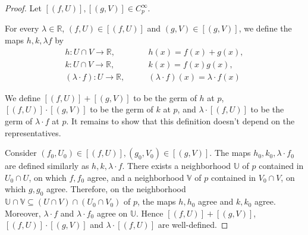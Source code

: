 \begin{proof}
	Let \( [(f, U)], [(g, V)] \in C^{\infty}_{p} \).

	For every \( \lambda \in \mathbb{R} \), \( (f, U) \in [(f, U)] \) and \( (g, V) \in [(g, V)] \), we define the maps \( h, k, \lambda f \) by
	\begin{align*}
		h: U \cap V \to \mathbb{R},         & \qquad h(x) = f(x) + g(x),                      \\
		k: U \cap V \to \mathbb{R},         & \qquad k(x) = f(x)g(x),                         \\
		(\lambda\cdot f): U \to \mathbb{R}, & \qquad (\lambda\cdot f)(x) = \lambda \cdot f(x)
	\end{align*}

	We define \( [(f, U)] + [(g, V)] \) to be the germ of \( h \) at \( p \), \(  [(f, U)]\cdot [(g, V)] \) to be the germ of \( k \) at \( p \), and \( \lambda\cdot [(f, U)] \) to be the germ of \( \lambda\cdot f \) at \( p \). It remains to show that this definition doesn't depend on the representatives.

	Consider \( (f_{0}, U_{0}) \in [(f, U)], (g_{0}, V_{0}) \in [(g, V)] \). The maps \( h_{0}, k_{0}, \lambda\cdot f_{0} \) are defined similarly as \( h, k, \lambda\cdot f \). There exists a neighborhood \( \mathbb{U} \) of \( p \) contained in \( U_{0} \cap U \), on which \( f, f_{0} \) agree, and a neighborhood \( \mathbb{V} \) of \( p \) contained in \( V_{0} \cap V \), on which \( g, g_{0} \) agree. Therefore, on the neighborhood \( \mathbb{U} \cap \mathbb{V} \subseteq (U \cap V) \cap (U_{0} \cap V_{0}) \) of \( p \), the maps \( h, h_{0} \) agree and \( k, k_{0} \) agree. Moreover, \( \lambda\cdot f \) and \( \lambda\cdot f_{0} \) agree on \( \mathbb{U} \). Hence \( [(f, U)] + [(g, V)] \), \( [(f, U)] \cdot [(g, V)] \) and \( \lambda\cdot[(f, U)] \) are well-defined.


\end{proof}
